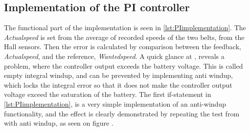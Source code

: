 \subsection{Implementation of the PI controller}
The functional part of the implementation is seen in \autoref{lst:PIimplementation}. The \emph{Actualspeed} is set from the average of recorded speeds of the two belts, from the Hall sensors. Then the error is calculated by comparison between the feedback, \emph{Actualspeed}, and the reference, \emph{Wantedspeed}.
A quick glance at , reveals a problem, where the controller output exceeds the battery voltage. This is called empty integral windup, and can be prevented by implementing anti windup, which locks the integral error so that it does not make the controller output voltage exceed the saturation of the battery. The first if-statement in \autoref{lst:PIimplementation}, is a very simple implementation of an anti-windup functionality, and the effect is clearly demonstrated by repeating the test from  with anti windup, as seen on figure .


